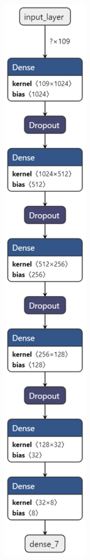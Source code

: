 \begin{figure}[h]
\begin{center}
\includegraphics[angle=90, width=15cm]{../../data/models/baseline3_nn_for_pixel}
\end{center}
\end{figure}

